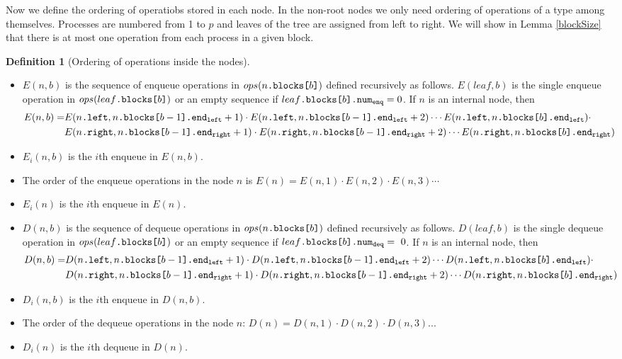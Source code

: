 \documentclass[10pt]{article}
\newcommand{\sub}[1]{\textsubscript{#1}}
\newcommand{\nf}[1]{{\normalfont{\texttt{#1}}}}
\theoremstyle{definition}
\newtheorem{definition}[theorem]{Definition}
\begin{document}
Now we define the ordering of operatiobs stored in each node. In the non-root nodes we only need ordering of operations of a type among themselves. Processes are numbered from 1 to $p$ and leaves of the tree are assigned from left to right. We will show in Lemma \ref{blockSize} that there is at most one operation from each process in a given block.
\begin{definition} [Ordering of operations inside the nodes] \label{ordering}
\end{definition}
\begin{itemize}
  \item $E(n,b)$ is the sequence of enqueue operations in $ops(n\nf{.blocks[}b\nf{]})$ defined recursively as follows. $E(leaf,b)$ is the single enqueue operation in $ops(leaf\nf{.blocks[}b\nf{]})$ or an empty sequence if $leaf\nf{.blocks[}b\nf{].num\sub{enq}}=0$. If $n$ is an internal node, then
\begin{align*} 
E(n,b) =&  E(n\nf{.left},n\nf{.blocks[}b-1\nf{].end\sub{left}}+1)\cdot E(n\nf{.left},n\nf{.blocks[}b-1\nf{].end\sub{left}}+2)\cdots E(n\nf{.left},n\nf{.blocks[}b\nf{].end\sub{left}})\cdot \\ 
&E(n\nf{.right},n\nf{.blocks[}b-1\nf{].end\sub{right}}+1)\cdot E(n\nf{.right},n\nf{.blocks[}b-1\nf{].end\sub{right}}+2)\cdots E(n\nf{.right},n\nf{.blocks[}b\nf{].end\sub{right}})
\end{align*}
  \item $E_i(n,b)$ is the $i$th enqueue in $E(n,b)$.
\item The order of the enqueue operations in the node $n$ is $E(n)=E(n,1)\cdot E(n,2)\cdot E(n,3)\cdots$
\item $E_i(n)$ is the $i$th enqueue in $E(n)$.
  \item $D(n,b)$ is the sequence of dequeue operations in $ops(n\nf{.blocks[}b\nf{]})$ defined recursively as follows. $D(leaf,b)$ is the single dequeue operation in $ops(leaf\nf{.blocks[}b\nf{]})$ or an empty sequence if $leaf\nf{.blocks[}b\nf{].num\sub{deq}}=~0$. If $n$ is an internal node, then
\begin{align*} 
D(n,b) =&  D(n\nf{.left},n\nf{.blocks[}b-1\nf{].end\sub{left}}+1)\cdot D(n\nf{.left}, n\nf{.blocks[}b-1\nf{].end\sub{left}}+2)\cdots D(n\nf{.left}, n\nf{.blocks[}b\nf{].end\sub{left}})\cdot \\ 
&D(n\nf{.right},n\nf{.blocks[}b-1\nf{].end\sub{right}}+1)\cdot D(n\nf{.right},n\nf{.blocks[}b-1\nf{].end\sub{right}}+2)\cdots D(n\nf{.right},n\nf{.blocks[}b\nf{].end\sub{right}})
\end{align*}
    \item $D_i(n,b)$ is the $i$th enqueue in $D(n,b)$.
\item The order of the dequeue operations in the node $n$: $D(n)=D(n,1)\cdot D(n,2)\cdot D(n,3)...$
\item $D_i(n)$ is the $i$th dequeue in $D(n)$.
\end{itemize}
\end{document}
